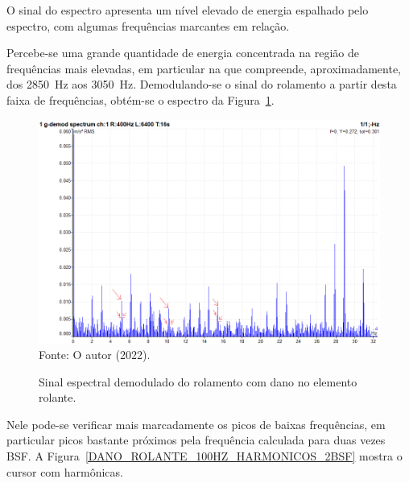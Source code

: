 \documentclass[
	12pt,				
	oneside,			
	a4paper,			
	english,			
	brazil,			
	]{abntex2ppgsi}
\begin{document}
O sinal do espectro apresenta um nível elevado de energia espalhado pelo espectro, com algumas frequências marcantes em relação. 

Percebe-se uma grande quantidade de energia concentrada na região de frequências mais elevadas, em particular na que compreende, aproximadamente, dos \SI{2850}{\hertz} aos \SI{3050}{\hertz}. Demodulando-se o sinal do rolamento a partir desta faixa de frequências, obtém-se o espectro da Figura~\ref{DANO_ROLANTE_100HZ_2BSF_SEM_BANDAS_HARMONICAS}. 

\begin{figure}[H]
\centering
\caption {Sinal espectral demodulado do rolamento com dano no elemento rolante.}
\includegraphics[width=\textwidth,keepaspectratio]{DANO_ROLANTE_100HZ_2BSF_SEM_BANDAS_HARMONICAS} \\
Fonte: O autor (2022).
\label{DANO_ROLANTE_100HZ_2BSF_SEM_BANDAS_HARMONICAS}
\end{figure}

Nele pode-se verificar mais marcadamente os picos de baixas frequências, em particular picos bastante próximos pela frequência calculada para duas vezes BSF. A Figura~\ref{DANO_ROLANTE_100HZ_HARMONICOS_2BSF} mostra o cursor com harmônicas. 
\end{document}
